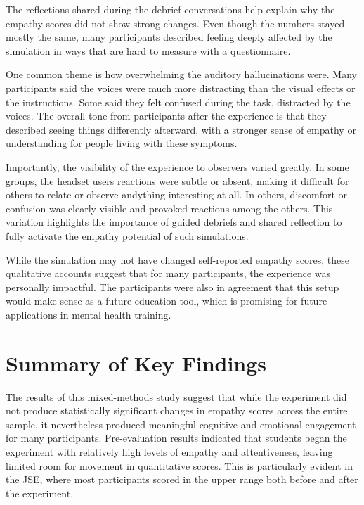 The reflections shared during the debrief conversations help explain why the empathy scores did not show strong changes. Even though the numbers stayed mostly the same, many participants described feeling deeply affected by the simulation in ways that are hard to measure with a questionnaire.

One common theme is how overwhelming the auditory hallucinations were. Many participants said the voices were much more distracting than the visual effects or the instructions. Some said they felt confused during the task, distracted by the voices. The overall tone from participants after the experience is that they described seeing things differently afterward, with a stronger sense of empathy or understanding for people living with these symptoms.

\vspace{1em}

Importantly, the visibility of the experience to observers varied greatly. In some groups, the headset users reactions were subtle or absent, making it difficult for others to relate or observe andything interesting at all. In others, discomfort or confusion was clearly visible and provoked reactions among the others. This variation highlights the importance of guided debriefs and shared reflection to fully activate the empathy potential of such simulations.

\vspace{1em}

While the simulation may not have changed self-reported empathy scores, these qualitative accounts suggest that for many participants, the experience was personally impactful. The participants were also in agreement that this setup would make sense as a future education tool, which is promising for future applications in mental health training.


\section{Summary of Key Findings}

The results of this mixed-methods study suggest that while the experiment did not produce statistically significant changes in empathy scores across the entire sample, it nevertheless produced meaningful cognitive and emotional engagement for many participants. Pre-evaluation results indicated that students began the experiment with relatively high levels of empathy and attentiveness, leaving limited room for  movement in quantitative scores. This is particularly evident in the JSE, where most participants scored in the upper range both before and after the experiment.

